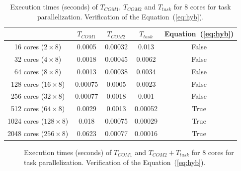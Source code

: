 \begin{table}[!h]
 \begin{center}
 \begin{tabular}{|c|c|c|c|c|}
    \hline 
    & $T_{COM1}$ & $T_{COM2}$ & $T_{task}$ & Equation~(\ref{eq:hyb})\\
   \hline
   16 cores ($2 \times 8$) & 0.0005 & 0.00032 & 0.013 & False\\
   32 cores ($4 \times 8$) & 0.0018 & 0.00045 & 0.0062 & False\\
   64 cores ($8 \times 8$) & 0.0013 & 0.00038 & 0.0034 & False\\
   128 cores ($16 \times 8$) & 0.00075 & 0.0005 & 0.0023 & False\\
   256 cores ($32 \times 8$) & 0.00077 & 0.0018 & 0.001 & False\\
   512 cores ($64 \times 8$) & 0.0029 & 0.0013 & 0.00052 & True\\
   1024 cores ($128 \times 8$) & 0.018 & 0.00075 & 0.00029 & True\\
   2048 cores ($256 \times 8$) & 0.0623 & 0.00077 & 0.00016 & True\\
   \hline
 \end{tabular}
\caption{Execution times (seconds) of $T_{COM1}$, $T_{COM2}$ and $T_{task}$ for 8 cores for task parallelization. Verification of the Equation~(\ref{eq:hyb}).}
\label{fig:tth}
 \end{center}
\end{table}

\begin{figure}[!h]\begin{center}
  \caption{Execution times (seconds) of $T_{COM1}$ and $T_{COM2} + T_{task}$ for 8 cores for task parallelization. Verification of the Equation~(\ref{eq:hyb}).}
  \label{fig:tth2}
\end{center}\end{figure}

